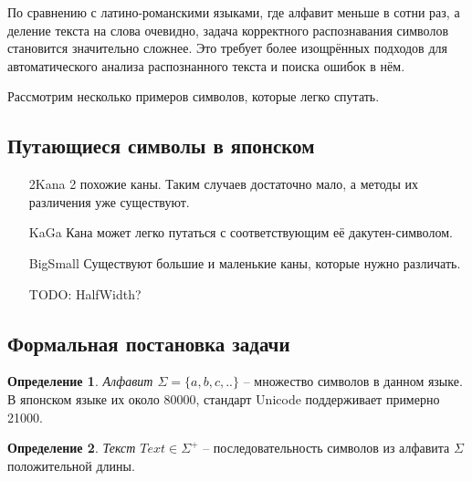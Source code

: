 \documentclass[14pt,russian]{extreport}
\theoremstyle{definition}
\newtheorem{definition}{Определение}[subsection]
\newcommand{\todo}[1]{}
\renewcommand{\todo}[1]{{\color{red} TODO: {#1}}}
\begin{document}
По сравнению с латино-романскими языками, где алфавит меньше в сотни раз, а деление текста на слова очевидно, задача корректного распознавания символов становится значительно сложнее. Это требует более изощрённых подходов для автоматического анализа распознанного текста и поиска ошибок в нём.

Рассмотрим несколько примеров символов, которые легко спутать.

\subsection{ Путающиеся символы в японском }

\begin{itemize}
	\item[2Kana] 2 похожие каны. Таким случаев достаточно мало, а методы их различения уже существуют.
	\begin{figure}[H]
	\end{figure}

	\item[KaGa] Кана может легко путаться с соответствующим её дакутен-символом.
	\begin{figure}[H]
	\end{figure}

	\item[BigSmall] Существуют большие и маленькие каны, которые нужно различать.
	\begin{figure}[H]
	\end{figure}

	\todo{HalfWidth?}
	
\end{itemize}

\subsection{ Формальная постановка задачи }

\begin{definition}
	{\textit{Алфавит $\Sigma = \{ a, b, c, .. \}$}} -- множество символов в данном языке. В японском языке их около 80000, стандарт Unicode поддерживает примерно 21000.
\end{definition}

\begin{definition}
	{\textit{Текст $Text \in \Sigma^+$}} -- последовательность символов из алфавита $\Sigma$ положительной длины.
\end{definition}
\end{document}

